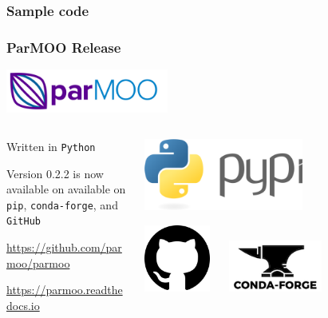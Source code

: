 \documentclass[aspectratio=169]{beamer}
\begin{document}
\begin{frame}[fragile]\frametitle{Sample code}
  \lstset{style=python}
  
\end{frame}

\begin{frame}\frametitle{ParMOO Release}

\begin{center}
\includegraphics[width=0.4\textwidth]{../img/logos/logo-parmoo.png}
\end{center}

\begin{columns}
\begin{column}{0.7\textwidth}

Written in {\tt Python}

\bigskip

Version 0.2.2 is now available on
available on {\tt pip}, {\tt conda-forge}, and {\tt GitHub}

\bigskip
\bigskip
\url{https://github.com/parmoo/parmoo}

\bigskip

\url{https://parmoo.readthedocs.io}
\end{column}
\begin{column}{0.2\textwidth}
\begin{center}
\includegraphics[width=0.6\textwidth]{../img/logos/logo-py.png}

\bigskip

\includegraphics[width=0.25\textwidth]{../img/logos/logo-gh.png}
$\quad$
\includegraphics[width=0.35\textwidth]{../img/logos/logo-conda.png}
\end{center}
\end{column}
\end{columns}


\end{frame}
\end{document}

